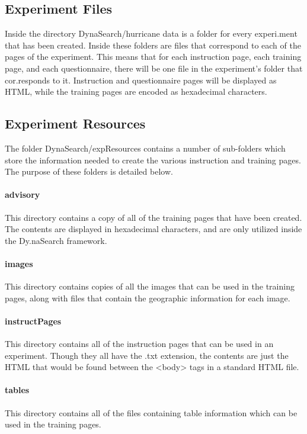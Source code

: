 \documentclass[article]{ij4uq}              %
\begin{document}
\subsection{Experiment Files}
Inside the directory DynaSearch/hurricane data is a folder for every experi.ment that has been created. Inside these folders are files that correspond to each of the pages of the experiment. This means that for each instruction page, each training page, and each questionnaire, there will be one file in the experiment's folder that cor.responds to it. Instruction and questionnaire pages will be displayed as HTML, while the training pages are encoded as hexadecimal characters.

\subsection{Experiment Resources}
The folder DynaSearch/expResources contains a number of sub-folders which store the information needed to create the various instruction and training pages. The purpose of these folders is detailed below.

\paragraph{advisory}
This directory contains a copy of all of the training pages that have been created. The contents are displayed in hexadecimal characters, and are only utilized inside the Dy.naSearch framework.

\paragraph{images}
This directory contains copies of all the images that can be used in the training pages, along with files that contain the geographic information for each image.

\paragraph{instructPages}
This directory contains all of the instruction pages that can be used in an experiment. Though they all have the .txt extension, the contents are just the HTML that would be found between the <body> tags in a standard HTML file. 

\paragraph{tables}
This directory contains all of the files containing table information which can be used in the training pages.
\end{document}
